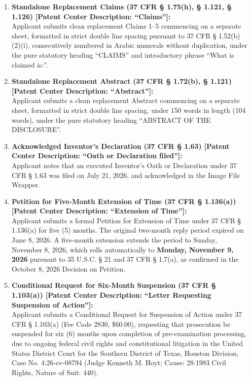 \documentclass[11pt,letterpaper]{article}
\begin{document}
\begin{enumerate}[leftmargin=*]
    \item \textbf{Standalone Replacement Claims (37 CFR \S{} 1.75(h), \S{} 1.121, \S{} 1.126) [Patent Center Description: ``Claims'']:} \\
    Applicant submits clean replacement Claims 1--5 commencing on a separate sheet, formatted in strict double line spacing pursuant to 37 CFR \S{} 1.52(b)(2)(i), consecutively numbered in Arabic numerals without duplication, under the pure statutory heading ``CLAIMS'' and introductory phrase ``What is claimed is:''.

    \item \textbf{Standalone Replacement Abstract (37 CFR \S{} 1.72(b), \S{} 1.121) [Patent Center Description: ``Abstract'']:} \\
    Applicant submits a clean replacement Abstract commencing on a separate sheet, formatted in strict double line spacing, under 150 words in length (104 words), under the pure statutory heading ``ABSTRACT OF THE DISCLOSURE''.

    \item \textbf{Acknowledged Inventor's Declaration (37 CFR \S{} 1.63) [Patent Center Description: ``Oath or Declaration filed'']:} \\
    Applicant notes that an executed Inventor's Oath or Declaration under 37 CFR \S{} 1.63 was filed on July 21, 2026, and acknowledged in the Image File Wrapper.

    \item \textbf{Petition for Five-Month Extension of Time (37 CFR \S{} 1.136(a)) [Patent Center Description: ``Extension of Time'']:} \\
    Applicant submits a formal Petition for Extension of Time under 37 CFR \S{} 1.136(a) for five (5) months. The original two-month reply period expired on June 8, 2026. A five-month extension extends the period to Sunday, November 8, 2026, which rolls automatically to \textbf{Monday, November 9, 2026} pursuant to 35 U.S.C. \S{} 21 and 37 CFR \S{} 1.7(a), as confirmed in the October 8, 2026 Decision on Petition.

    \item \textbf{Conditional Request for Six-Month Suspension (37 CFR \S{} 1.103(a)) [Patent Center Description: ``Letter Requesting Suspension of Action'']:} \\
    Applicant submits a Conditional Request for Suspension of Action under 37 CFR \S{} 1.103(a) (Fee Code 2830, \$60.00), requesting that prosecution be suspended for six (6) months upon completion of pre-examination processing, due to ongoing federal civil rights and constitutional litigation in the United States District Court for the Southern District of Texas, Houston Division, Case No. 4:26-cv-08794 (Judge Kenneth M. Hoyt; Cause: 28:1983 Civil Rights, Nature of Suit: 440).
\end{enumerate}
\end{document}
